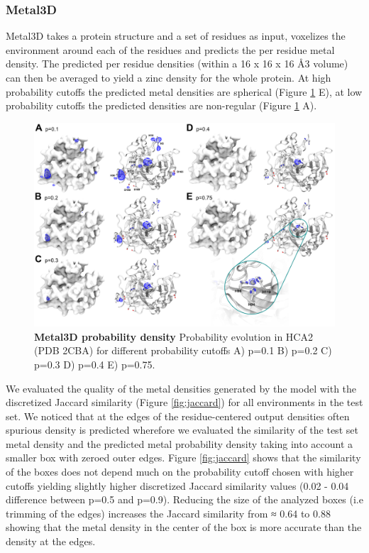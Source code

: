 \documentclass[  ASAPversion,
  ,
  9pt]{elife}
\begin{document}
\hypertarget{metal3d}{%
\subsubsection{Metal3D}\label{metal3d}}

Metal3D takes a protein structure and a set of residues as input, voxelizes the environment around each of the residues and predicts the per residue metal density. The predicted per residue densities (within a 16 x 16 x 16 Å3 volume) can then be averaged to yield a zinc density for the whole protein. At high probability cutoffs the predicted metal densities are spherical (Figure \ref{fig:2cbaprobabilities} E), at low probability cutoffs the predicted densities are non-regular (Figure \ref{fig:2cbaprobabilities} A).

\begin{figure}
\hypertarget{fig:2cbaprobabilities}{%
\centering
\includegraphics{images/2CBA_probabilities.png}
\caption{\textbf{Metal3D probability density} Probability evolution in HCA2 (PDB 2CBA) for different probability cutoffs A) p=0.1 B) p=0.2 C) p=0.3 D) p=0.4 E) p=0.75.}\label{fig:2cbaprobabilities}
}
\end{figure}

We evaluated the quality of the metal densities generated by the model with the discretized Jaccard similarity (Figure \ref{fig:jaccard}) for all environments in the test set. We noticed that at the edges of the residue-centered output densities often spurious density is predicted wherefore we evaluated the similarity of the test set metal density and the predicted metal probability density taking into account a smaller box with zeroed outer edges. Figure \ref{fig:jaccard} shows that the similarity of the boxes does not depend much on the probability cutoff chosen with higher cutoffs yielding slightly higher discretized Jaccard similarity values (0.02 - 0.04 difference between p=0.5 and p=0.9). Reducing the size of the analyzed boxes (i.e trimming of the edges) increases the Jaccard similarity from ≈ 0.64 to 0.88 showing that the metal density in the center of the box is more accurate than the density at the edges.
\end{document}

